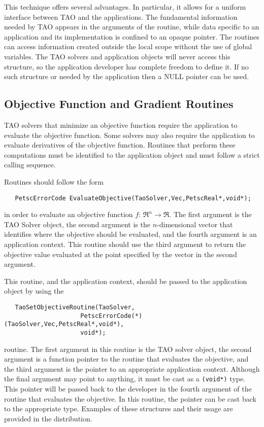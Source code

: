 This technique offers several advantages.
In particular, it allows for a uniform interface between TAO and 
the applications.   The fundamental information needed by TAO 
appears in the arguments of the routine, while data specific to an application
and its implementation is confined to an opaque pointer.
The routines can access information created outside the 
local scope without the use of global variables.
The TAO solvers and application objects will never access this structure, 
so the application developer has complete freedom to define it. If no 
such structure or needed by the application then a NULL pointer can be used.



\subsection{Objective Function and Gradient Routines}\label{sec:fghj}

TAO solvers that minimize an objective function require
the application to evaluate the objective function.  Some solvers
may also require the application to evaluate
derivatives of the objective function.  
Routines that perform these computations must be identified
to the application object and must follow a strict calling sequence.

Routines should follow the form
\begin{verbatim}
   PetscErrorCode EvaluateObjective(TaoSolver,Vec,PetscReal*,void*);
\end{verbatim}
in order to evaluate an objective function $f: \, \Re^n \to \Re$. 
The first argument is the TAO Solver object, the second argument is the
$n$-dimensional vector that identifies where the objective should be evaluated, 
and the fourth argument is an application context.
This routine should use the third argument to return the objective value 
evaluated at the point
specified by the vector in the second argument.

This routine, and the application context, should be passed to the 
application object by using
the  
\begin{verbatim}
   TaoSetObjectiveRoutine(TaoSolver,
                     PetscErrorCode(*)(TaoSolver,Vec,PetscReal*,void*),
                     void*);
\end{verbatim}
routine. 
The first argument in this routine is the TAO solver object, 
the second argument is a function pointer to the routine that 
evaluates the objective, and the third
argument is the pointer to an appropriate application context.  
Although the final argument may point to anything, it must be cast as a {\tt (void*)} type.
This pointer will be passed back to the developer in the fourth argument of the
routine that evaluates the objective.  In this routine, the pointer can be cast
back to the appropriate type.  Examples of these structures and their 
usage are provided in the distribution.

